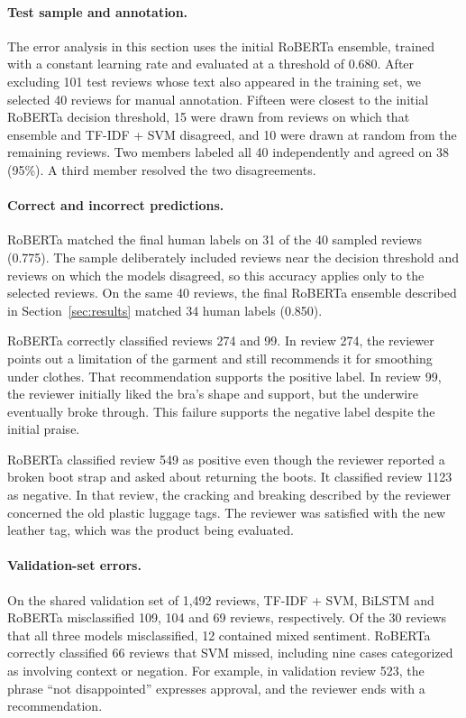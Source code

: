 \paragraph{Test sample and annotation.}
The error analysis in this section uses the initial RoBERTa ensemble,
trained with a constant learning rate and evaluated at a threshold of
0.680. After excluding 101 test reviews whose text also appeared in
the training set, we selected 40 reviews for manual annotation.
Fifteen were closest to the initial RoBERTa decision threshold,
15 were drawn from reviews on which that ensemble and TF-IDF + SVM
disagreed, and 10 were drawn at random from the remaining reviews.
Two members labeled all 40 independently and agreed on 38 (95\%).
A third member resolved the two disagreements.

\paragraph{Correct and incorrect predictions.}
RoBERTa matched the final human labels on 31 of the 40 sampled reviews
(0.775). The sample deliberately included reviews near the decision
threshold and reviews on which the models disagreed, so this accuracy
applies only to the selected reviews. On the same 40 reviews, the final RoBERTa ensemble described in
Section~\ref{sec:results} matched 34 human labels (0.850).

RoBERTa correctly classified reviews 274 and 99. In review 274, the
reviewer points out a limitation of the garment and still recommends
it for smoothing under clothes. That recommendation supports the
positive label. In review 99, the reviewer initially liked the bra's
shape and support, but the underwire eventually broke through. This
failure supports the negative label despite the initial praise.

RoBERTa classified review 549 as positive even though the reviewer
reported a broken boot strap and asked about returning the boots.
It classified review 1123 as negative. In that review, the cracking
and breaking described by the reviewer concerned the old plastic
luggage tags. The reviewer was satisfied with the new leather tag,
which was the product being evaluated.

\paragraph{Validation-set errors.}
On the shared validation set of 1,492 reviews, TF-IDF + SVM,
BiLSTM and RoBERTa misclassified 109, 104 and 69 reviews,
respectively. Of the 30 reviews that all three models
misclassified, 12 contained mixed sentiment. RoBERTa correctly
classified 66 reviews that SVM missed, including nine cases
categorized as involving context or negation. For example, in
validation review 523, the phrase ``not disappointed'' expresses
approval, and the reviewer ends with a recommendation.